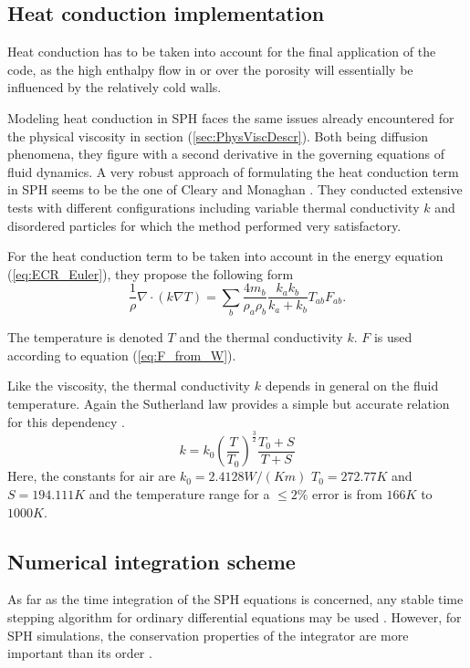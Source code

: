 \documentclass[11pt,a4paper,twoside]{report}
\begin{document}
\subsection{Heat conduction implementation}
\label{sec:HeatCondImplementation}
Heat conduction has to be taken into account for the final application of the code, as the high enthalpy flow in or over the porosity will essentially be influenced by the relatively cold walls. 

Modeling heat conduction in SPH faces the same issues already encountered for the physical viscosity  in section (\ref{sec:PhysViscDescr}). Both being diffusion phenomena, they figure with a second derivative in the governing equations of fluid dynamics. 
A very robust approach of formulating the heat conduction term in SPH seems to be the one of Cleary and Monaghan \cite{Cleary1999}. They conducted extensive tests with different configurations including variable thermal conductivity $k$ and disordered particles for which the method performed very satisfactory.

For the heat conduction term to be taken into account in the energy equation (\ref{eq:ECR_Euler}), they propose the following form
\begin{equation}
 \label{eq:heatConductionTerm}
\frac{1}{\rho}\nabla \cdot (k \nabla T)=\sum_b\frac{4 m_b}{\rho_a \rho_b} \frac{k_a k_b}{k_a + k_b} T_{ab} F_{ab}.
\end{equation}

The temperature is denoted $T$ and the thermal conductivity $k$. $F$ is used according to equation (\ref{eq:F_from_W}). 

Like the viscosity, the thermal conductivity $k$ depends in general on the fluid temperature. Again the Sutherland law provides a simple but accurate relation for this dependency \cite{White1974}.
\begin{equation}
k=k_0 \left(\frac{T}{T_0}\right)^{\frac{3}{2}}\frac{T_0+S}{T+S}
\end{equation}
Here, the constants for air are $k_0=2.4128W/(K m)$ $T_0=272.77K$ and $S=194.111K$ and the temperature range for a  $\leq2\%$ error is from $166K$ to $1000K$. 



\subsection{Numerical integration scheme}
\label{sec:numIntegr}

As far as the time integration of the SPH equations is concerned, any stable
time stepping algorithm for ordinary differential equations may be
used \cite{Monaghan2005}. However, for SPH simulations, the conservation properties
of the integrator are more important than its
order \cite{Monaghan2005}.
\end{document}
